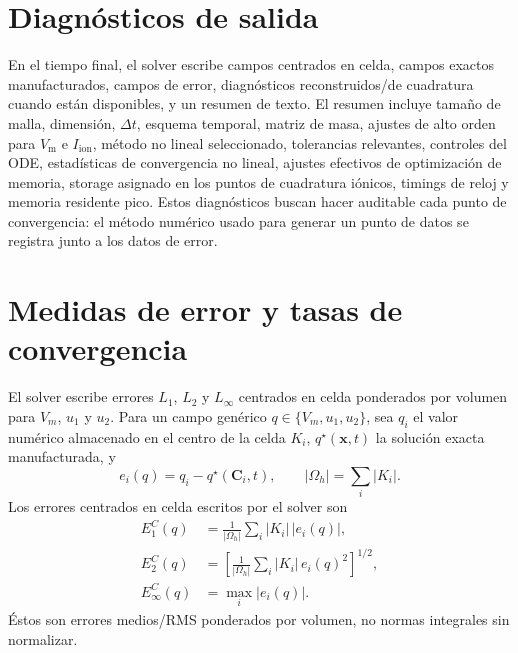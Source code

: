 \documentclass[11pt,a4paper]{article}
\newcommand{\Vm}{V_{\text{m}}}
\newcommand{\Iion}{I_{\mathrm{ion}}}
\begin{document}
\section{Diagnósticos de salida}

En el tiempo final, el solver escribe campos centrados en celda, campos exactos
manufacturados, campos de error, diagnósticos reconstruidos/de cuadratura cuando están
disponibles, y un resumen de texto. El resumen incluye tamaño de malla, dimensión, $\Delta t$,
esquema temporal, matriz de masa, ajustes de alto orden para $\Vm$ e $\Iion$, método no lineal
seleccionado, tolerancias relevantes, controles del ODE, estadísticas de convergencia no
lineal, ajustes efectivos de optimización de memoria, storage asignado en los puntos de
cuadratura iónicos, timings de reloj y memoria residente pico. Estos diagnósticos buscan hacer
auditable cada punto de convergencia: el método numérico usado para generar un punto de datos
se registra junto a los datos de error.

\section{Medidas de error y tasas de convergencia}
El solver escribe errores $L_1$, $L_2$ y $L_\infty$ centrados en celda ponderados por volumen
para $V_m$, $u_1$ y $u_2$. Para un campo genérico $q\in\{V_m,u_1,u_2\}$, sea $q_i$ el valor
numérico almacenado en el centro de la celda $K_i$, $q^\star(\mathbf{x},t)$ la solución exacta
manufacturada, y
\begin{equation}
  e_i(q)=q_i-q^\star(\mathbf{C}_i,t),
  \qquad
  |\Omega_h|=\sum_i |K_i|.
\end{equation}
Los errores centrados en celda escritos por el solver son
\begin{align}
  E_{1}^{C}(q)
  &=
  \frac{1}{|\Omega_h|}
  \sum_i |K_i|\,|e_i(q)|,
  \label{eq:cell-l1-error}
  \\
  E_{2}^{C}(q)
  &=
  \left[
  \frac{1}{|\Omega_h|}
  \sum_i |K_i|\,e_i(q)^2
  \right]^{1/2},
  \label{eq:cell-l2-error}
  \\
  E_{\infty}^{C}(q)
  &=
  \max_i |e_i(q)|.
  \label{eq:cell-linf-error}
\end{align}
Éstos son errores medios/RMS ponderados por volumen, no normas integrales sin normalizar.
\end{document}
